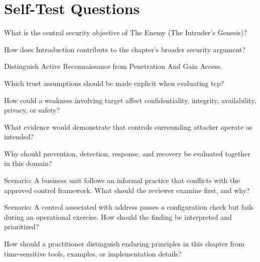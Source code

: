 \documentclass[11pt,letterpaper]{article}
\begin{document}
\section*{Self-Test Questions}
\begin{CornellRecallList}
\item What is the central security objective of The Enemy (The Intruder's Genesis)?
\item How does Introduction contribute to the chapter's broader security argument?
\item Distinguish Active Reconnaissance from Penetration And Gain Access.
\item Which trust assumptions should be made explicit when evaluating tcp?
\item How could a weakness involving target affect confidentiality, integrity, availability, privacy, or safety?
\item What evidence would demonstrate that controls surrounding attacker operate as intended?
\item Why should prevention, detection, response, and recovery be evaluated together in this domain?
\item Scenario: A business unit follows an informal practice that conflicts with the approved control framework. What should the reviewer examine first, and why?
\item Scenario: A control associated with address passes a configuration check but fails during an operational exercise. How should the finding be interpreted and prioritized?
\item How should a practitioner distinguish enduring principles in this chapter from time-sensitive tools, examples, or implementation details?
\end{CornellRecallList}
\end{document}
